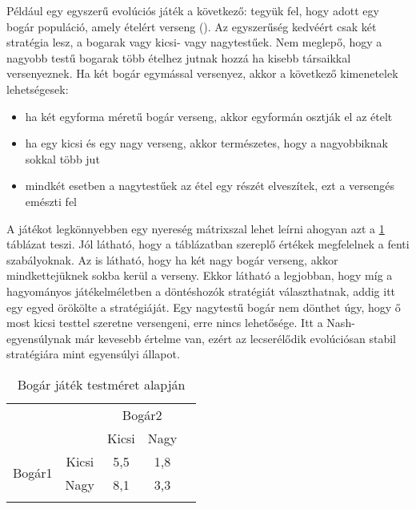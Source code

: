 Például egy egyszerű evolúciós játék a következő: tegyük fel, hogy adott egy bogár populáció, amely ételért verseng (\cite{book:egt}). Az egyszerűség kedvéért csak két stratégia lesz, a bogarak vagy kicsi- vagy nagytestűek. Nem meglepő, hogy a nagyobb testű bogarak több ételhez jutnak hozzá ha kisebb társaikkal versenyeznek. Ha két bogár egymással versenyez, akkor a következő kimenetelek lehetségesek:
\begin{itemize}[noitemsep]
	\item ha két egyforma méretű bogár verseng, akkor egyformán osztják el az ételt
	\item ha egy kicsi és egy nagy verseng, akkor természetes, hogy a nagyobbiknak sokkal több jut
	\item mindkét esetben a nagytestűek az étel egy részét elveszítek, ezt a versengés emészti fel 
\end{itemize}
A játékot legkönnyebben egy nyereség mátrixszal lehet leírni ahogyan azt a \ref{fig:beetle} táblázat teszi. Jól látható, hogy a táblázatban szereplő értékek megfelelnek a fenti szabályoknak. Az is látható, hogy ha két nagy bogár verseng, akkor mindkettejüknek sokba kerül a verseny.
Ekkor látható a legjobban, hogy míg a hagyományos játékelméletben a döntéshozók stratégiát választhatnak, addig itt egy egyed örökölte a stratégiáját. Egy nagytestű bogár nem dönthet úgy, hogy ő most kicsi testtel szeretne versengeni, erre nincs lehetősége. Itt a Nash-egyensúlynak már kevesebb értelme van, ezért az lecserélődik evolúciósan stabil stratégiára mint egyensúlyi állapot.

\begin{table}[htb!]
	\centering
	\begin{tabular}{ccccc}
		&       & \multicolumn{2}{c}{Bogár2} &  \\
		\multicolumn{1}{c}{}    &       & Kicsi        & Nagy        &  \\ \cline{3-4}
		\multirow{2}{*}{Bogár1} & Kicsi & \multicolumn{1}{|c|}{5,5}          & \multicolumn{1}{c|}{1,8}         &  \\ \cline{3-4}
		& Nagy  & \multicolumn{1}{|c|}{8,1}          & \multicolumn{1}{c|}{3,3}         & \\ \cline{3-4} \\
	\end{tabular}
	\caption{Bogár játék testméret alapján}
	\label{fig:beetle}
\end{table}